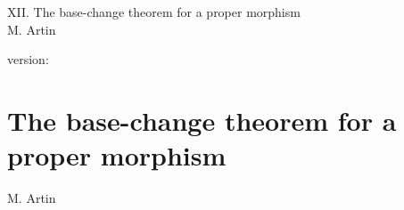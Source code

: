 \documentclass[10pt]{../fichiers-configuration-latex/smfart}
\begin{document}
\begin{center}
XII. The base-change theorem for a proper morphism\\
M. Artin
\end{center}

version: \showgitstatus
\tableofcontents

\else
\chapter{The base-change theorem for a proper morphism}
\begin{center}
M. Artin
\end{center}
\fi
{}\label{sga4.exp.XII}














\end{document}

